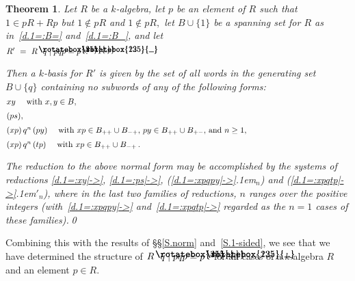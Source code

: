 \documentclass{amsart}
\newtheorem{theorem}{Theorem}
\DeclareRobustCommand{\lang}{\begin{picture}(5,7)
\put(1.2,2.5){\rotatebox{45}{\line(1,0){6.0}}}
\put(1.2,2.5){\rotatebox{315}{\line(1,0){6.0}}}
\end{picture}\kern.16em}
\DeclareRobustCommand{\rang}{\kern.1em\begin{picture}(5,7)
\put(.1,2.5){\rotatebox{135}{\line(1,0){6.0}}}
\put(.1,2.5){\rotatebox{225}{\line(1,0){6.0}}}
\end{picture}}
\begin{document}
\begin{theorem}\label{T.1=}
Let $R$ be a $\!k\!$-algebra, let $p$ be an element of $R$
such that $1\in pR+Rp$ but $1\notin pR$ and $1\notin pR,$
let $B\cup\{1\}$ be a spanning set for $R$
as in~\eqref{d.1=:B=} and~\eqref{d.1=:B_}, and let
\begin{equation}\begin{minipage}[c]{35pc}\label{d.1=:R'}
$R'\ =\ R\lang q\mid pqp=p\rang.$
\end{minipage}\end{equation}

Then a $\!k\!$-basis for $R'$ is given by the set of all
words in the generating set $B\cup\{q\}$ containing no
subwords of any of the following forms:
\begin{equation}\begin{minipage}[c]{35pc}\label{d.1=:xy}
$xy$ \quad with $x,y\in B,$
\end{minipage}\end{equation}
\begin{equation}\begin{minipage}[c]{35pc}\label{d.1=:ps}
$(ps),$
\end{minipage}\end{equation}
\begin{equation}\begin{minipage}[c]{35pc}\label{d.1=:xpqpy}
$(xp)\,q^n\,(py)$ \quad with $xp\in B_{++}\cup B_{-+},$
$py\in B_{++}\cup B_{+-},$ and $n\geq 1,$
\end{minipage}\end{equation}
\begin{equation}\begin{minipage}[c]{35pc}\label{d.1=:xpqtp}
$(xp)\,q^n\,(tp)$ \quad with $xp\in B_{++}\cup B_{-+}\,.$
\end{minipage}\end{equation}

The reduction to the above normal
form may be accomplished by the systems of
reductions \eqref{d.1=:xy|->},
\eqref{d.1=:ps|->},
\textup{({{\setlength{\mathsurround}{0em}\ref{d.1=:xpqpy|->}\kern.1em$_{{n}}$}})} and
\textup{({{\setlength{\mathsurround}{0em}\ref{d.1=:xpqtp|->}\kern.1em$'_{{n}}$}})}, where in the last two families
of reductions, $n$ ranges over the positive integers
\textup{(}with~\eqref{d.1=:xpqpy|->}
and~\eqref{d.1=:xpqtp|->} regarded as the $n=1$ cases of
these families\textup{)}.\qed
\end{theorem}

Combining this with the results of \S\S\ref{S.norm} and~\ref{S.1-sided},
we see that we have determined the structure of
$R\lang q\mid pqp=p\rang$ for all cases of a $\!k\!$-algebra $R$
and an element $p\in R.$
\end{document}
